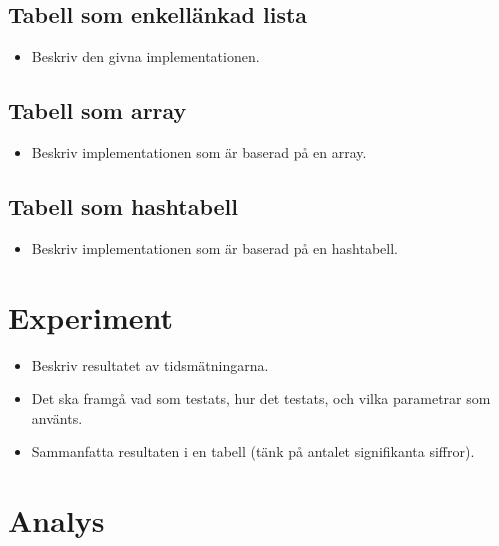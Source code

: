 \documentclass[a4paper,12pt]{article}
\newcommand{\todo}[1]{{\color{red} #1}}
\begin{document}
\subsection{Tabell som enkellänkad lista}
\label{sec:tabell-som-enkell}

\begin{itemize}
\item \todo{Beskriv den givna implementationen.}
\end{itemize}


\subsection{Tabell som array}
\label{sec:tabell-som-array}

\begin{itemize}
\item \todo{Beskriv implementationen som är baserad på en array.}
\end{itemize}


\subsection{Tabell som hashtabell}
\label{sec:tabell-som-hasht}

\begin{itemize}
\item \todo{Beskriv implementationen som är baserad på en hashtabell.}
\end{itemize}



\section{Experiment}
\label{sec:experiment}

\begin{itemize}
\item \todo{Beskriv resultatet av tidsmätningarna.}
\item \todo{Det ska framgå vad som testats, hur det testats, och vilka parametrar som använts.}
\item \todo{Sammanfatta resultaten i en tabell (tänk på antalet signifikanta siffror).}
\end{itemize}



\section{Analys}
\label{sec:analys}
\end{document}
